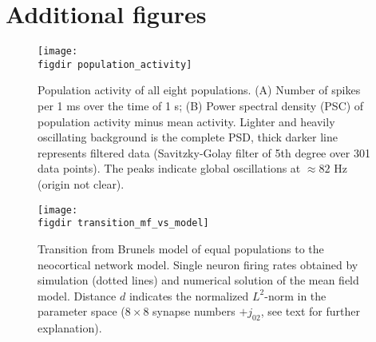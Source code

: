 \section{Additional figures}
\begin{figure}[htpb]
    \centering
    \texttt{[image: \\figdir population\_activity]}
    \caption{Population activity of all eight populations.
        (A) Number of spikes per 1 ms over the time of 1 s;
        (B) Power spectral density (PSC) of population activity minus mean activity. 
        Lighter and heavily oscillating background is the complete PSD, thick darker 
        line represents filtered data (Savitzky-Golay filter of 5th degree over 301 data points).
        The peaks indicate global oscillations at $\approx 82$ Hz (origin not clear).
    }
    \label{fig:population_activity}
\end{figure}

\begin{figure}[htpb]
    \centering
    \texttt{[image: \\figdir transition\_mf\_vs\_model]}
    \caption{Transition from Brunels model of equal populations to the neocortical network model. 
        Single neuron firing rates obtained by simulation (dotted lines) and 
        numerical solution of the mean field model. Distance $d$ indicates the 
        normalized $L^2$-norm in the parameter space ($8 \times 8$ synapse numbers $+ j_{02}$, see text
        for further explanation). 
    }
    \label{fig:transition_mf_vs_model}
\end{figure}



